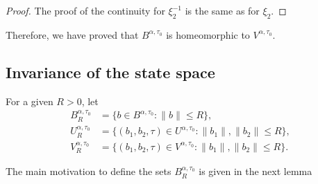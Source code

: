 \documentclass[a4paper,11pt]{article}
\theoremstyle{plain}
\theoremstyle{definition}
\theoremstyle{definition}
\numberwithin{equation}{section}
\begin{document}
\begin{proof}
The proof of the continuity for $\xi_2^{-1}$ is the same as for $\xi_2$.
\end{proof}

Therefore, we have proved that $B^{\alpha,\tau_0}$ is homeomorphic to $V^{\alpha,\tau_0}$.

\subsection{Invariance of the state space}

For a given $R>0$, let
\begin{align*}
    B^{\alpha,\tau_0}_R &= \{ b\in B^{\alpha,\tau_0} \colon \| b \|\leq R \}, \\
    U^{\alpha,\tau_0}_R &= \{ (b_1,b_2,\tau)\in U^{\alpha,\tau_0} \colon \|b_1\|, \|b_2\|\leq R \}, \\
    V^{\alpha,\tau_0}_R &= \{ (b_1,b_2,\tau)\in V^{\alpha,\tau_0} \colon \|b_1\|,\|b_2\| \leq R \}.
\end{align*}

The main motivation to define the sets $B^{\alpha,\tau_0}_R$ is given in the next lemma
\end{document}
